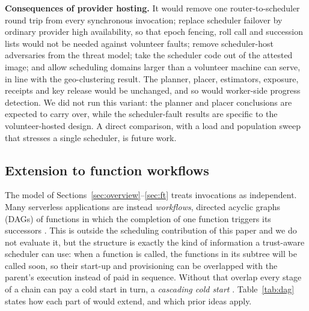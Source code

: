 \textbf{Consequences of provider hosting.} It would remove one router-to-scheduler round trip from every synchronous invocation; replace scheduler failover by ordinary provider high availability, so that epoch fencing, roll call and succession lists would not be needed against volunteer faults; remove scheduler-host adversaries from the threat model; take the scheduler code out of the attested image; and allow scheduling domains larger than a volunteer machine can serve, in line with the geo-clustering result. The planner, placer, estimators, exposure, receipts and key release would be unchanged, and so would worker-side progress detection. We did not run this variant: the planner and placer conclusions are expected to carry over, while the scheduler-fault results are specific to the volunteer-hosted design. A direct comparison, with a load and population sweep that stresses a single scheduler, is future work.

\subsection{Extension to function workflows}
\label{sec:dag}
The model of Sections~\ref{sec:overview}--\ref{sec:ft} treats invocations as independent. Many serverless applications are instead
\emph{workflows}, directed acyclic graphs (DAGs) of functions in which the completion of one function triggers its successors
\cite{copik2024sebsflow}. This is outside the scheduling contribution of this paper and we do not evaluate it, but the structure is
exactly the kind of information a trust-aware scheduler can use: when a function is called, the functions in its subtree will be called
soon, so their start-up and provisioning can be overlapped with the parent's execution instead of paid in sequence. Without that
overlap every stage of a chain can pay a cold start in turn, a \emph{cascading cold start} \cite{daw2020xanadu}. Table~\ref{tab:dag}
states how each part of \voss{} would extend, and which prior ideas apply.


